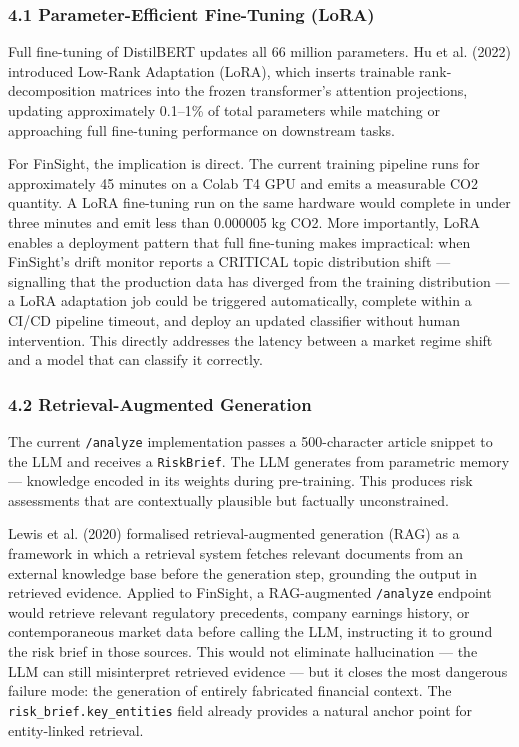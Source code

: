 \documentclass[11pt,a4paper]{article}
\begin{document}
\subsubsection*{4.1 Parameter-Efficient Fine-Tuning (LoRA)}

Full fine-tuning of DistilBERT updates all 66 million parameters. Hu et al. (2022) introduced Low-Rank Adaptation (LoRA), which inserts trainable rank-decomposition matrices into the frozen transformer's attention projections, updating approximately 0.1–1\% of total parameters while matching or approaching full fine-tuning performance on downstream tasks.

For FinSight, the implication is direct. The current training pipeline runs for approximately 45 minutes on a Colab T4 GPU and emits a measurable CO2 quantity. A LoRA fine-tuning run on the same hardware would complete in under three minutes and emit less than 0.000005 kg CO2. More importantly, LoRA enables a deployment pattern that full fine-tuning makes impractical: when FinSight's drift monitor reports a CRITICAL topic distribution shift — signalling that the production data has diverged from the training distribution — a LoRA adaptation job could be triggered automatically, complete within a CI/CD pipeline timeout, and deploy an updated classifier without human intervention. This directly addresses the latency between a market regime shift and a model that can classify it correctly.

\subsubsection*{4.2 Retrieval-Augmented Generation}

The current \texttt{/analyze} implementation passes a 500-character article snippet to the LLM and receives a \texttt{RiskBrief}. The LLM generates from parametric memory — knowledge encoded in its weights during pre-training. This produces risk assessments that are contextually plausible but factually unconstrained.

Lewis et al. (2020) formalised retrieval-augmented generation (RAG) as a framework in which a retrieval system fetches relevant documents from an external knowledge base before the generation step, grounding the output in retrieved evidence. Applied to FinSight, a RAG-augmented \texttt{/analyze} endpoint would retrieve relevant regulatory precedents, company earnings history, or contemporaneous market data before calling the LLM, instructing it to ground the risk brief in those sources. This would not eliminate hallucination — the LLM can still misinterpret retrieved evidence — but it closes the most dangerous failure mode: the generation of entirely fabricated financial context. The \texttt{risk\_brief.key\_entities} field already provides a natural anchor point for entity-linked retrieval.
\end{document}
